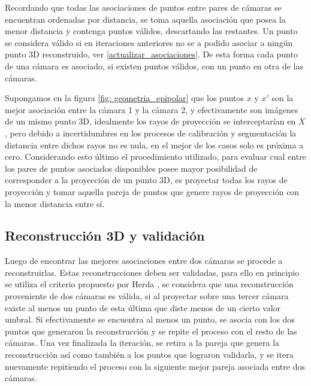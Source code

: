 Recordando que todas las asociaciones de puntos entre pares de cámaras se encuentran ordenadas por distancia, se toma aquella asociación que posea la menor distancia y contenga puntos válidos, descartando las restantes. Un punto se considera válido si en iteraciones anteriores no se a podido asociar a ningún punto 3D reconstruido, ver \ref{actualizar_asociaciones}.
De esta forma cada punto de una cámara es asociado, si existen puntos válidos, con un punto en otra de las cámaras.


 Supongamos en la figura \ref{fig: geometria_epipolar} que los puntos $x$ y $x'$ son la mejor asociación entre la cámara 1 y la cámara 2, y efectivamente son imágenes de un mismo punto 3D, idealmente los rayos de proyección se interceptarían en $X$, pero debido a incertidumbres en los procesos de calibración y segmentación la distancia entre dichos rayos no es nula, en el mejor de los casos solo es próxima a cero. 
Considerando esto último el procedimiento utilizado, para evaluar cual entre los pares de puntos asociados disponibles posee mayor posibilidad de corresponder a la proyección de un punto 3D, es proyectar todas los rayos de proyección y tomar aquella pareja de puntos que genere rayos de proyección con la menor distancia entre sí.


\subsection{Reconstrucción 3D y validación}\label{seccion_reconstruccion3D_validacion}


Luego de encontrar las mejores asociaciones entre dos cámaras se procede a reconstruirlas. Estas reconstrucciones deben ser validadas, para ello en principio se utiliza el  criterio propuesto por Herda \cite{herda}, se considera que una reconstrucción proveniente de dos cámaras es válida, si al proyectar sobre una tercer cámara existe al menos un punto de esta última que diste menos de un cierto valor umbral. Si efectivamente se encuentra al menos un punto, se asocia con los dos puntos que generaron la reconstrucción y se repite el proceso con el resto de las cámaras. Una vez finalizada la iteración, se retira a la pareja que genera la reconstrucción así como también a los puntos que lograron validarla, y se itera nuevamente repitiendo el proceso con la siguiente mejor pareja asociada entre dos cámaras.  


